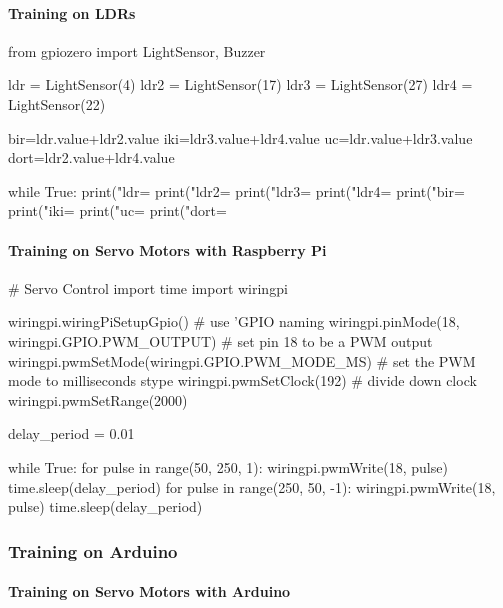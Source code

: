 \paragraph{Training on LDRs}
\begin{python}
from gpiozero import LightSensor, Buzzer  

ldr = LightSensor(4)   
ldr2 = LightSensor(17) 
ldr3 = LightSensor(27) 
ldr4 = LightSensor(22) 

bir=ldr.value+ldr2.value 
iki=ldr3.value+ldr4.value 
uc=ldr.value+ldr3.value 
dort=ldr2.value+ldr4.value 

while True:  
    print("ldr= %
    print("ldr2= %
    print("ldr3= %
    print("ldr4= %
    print("bir= %
    print("iki= %
    print("uc= %
    print("dort= %
\end{python}
\paragraph{Training on Servo Motors with Raspberry Pi}
\begin{python}
# Servo Control 
import time  
import wiringpi  

wiringpi.wiringPiSetupGpio()  # use 'GPIO naming
wiringpi.pinMode(18, wiringpi.GPIO.PWM_OUTPUT)  # set pin 18 to be a PWM output
wiringpi.pwmSetMode(wiringpi.GPIO.PWM_MODE_MS)	# set the PWM mode to milliseconds stype
wiringpi.pwmSetClock(192)  # divide down clock
wiringpi.pwmSetRange(2000)  

delay_period = 0.01  

while True:  
    for pulse in range(50, 250, 1):  
        wiringpi.pwmWrite(18, pulse)  
        time.sleep(delay\_period)  
    for pulse in range(250, 50, -1):  
        wiringpi.pwmWrite(18, pulse)  
        time.sleep(delay_period)  
\end{python}
\subsubsection{Training on Arduino}

\paragraph{Training on Servo Motors with Arduino}

